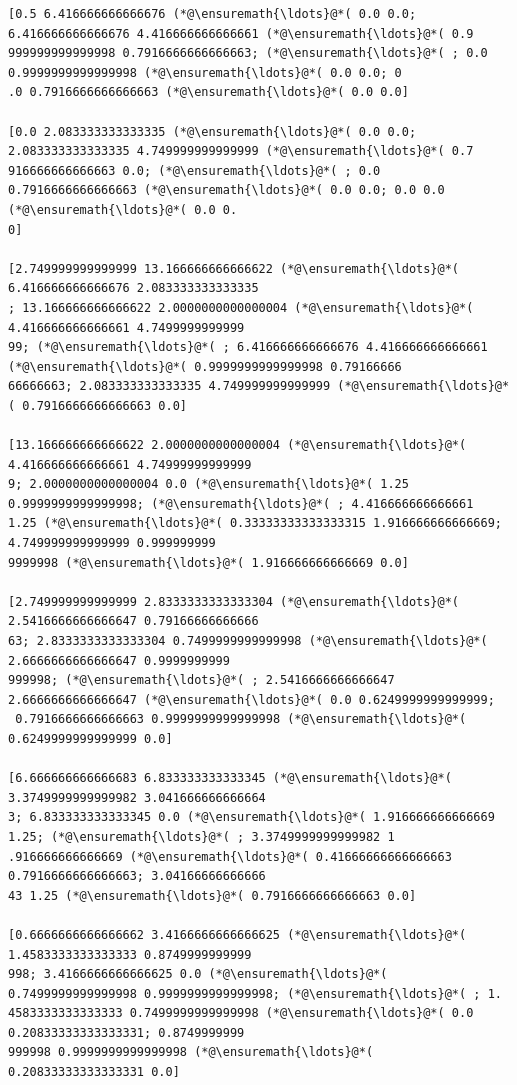 \documentclass[12pt,a4paper]{article}
\begin{document}
\begin{lstlisting}
[0.5 6.416666666666676 (*@\ensuremath{\ldots}@*( 0.0 0.0; 6.416666666666676 4.416666666666661 (*@\ensuremath{\ldots}@*( 0.9
999999999999998 0.7916666666666663; (*@\ensuremath{\ldots}@*( ; 0.0 0.9999999999999998 (*@\ensuremath{\ldots}@*( 0.0 0.0; 0
.0 0.7916666666666663 (*@\ensuremath{\ldots}@*( 0.0 0.0]

[0.0 2.083333333333335 (*@\ensuremath{\ldots}@*( 0.0 0.0; 2.083333333333335 4.749999999999999 (*@\ensuremath{\ldots}@*( 0.7
916666666666663 0.0; (*@\ensuremath{\ldots}@*( ; 0.0 0.7916666666666663 (*@\ensuremath{\ldots}@*( 0.0 0.0; 0.0 0.0 (*@\ensuremath{\ldots}@*( 0.0 0.
0]

[2.749999999999999 13.166666666666622 (*@\ensuremath{\ldots}@*( 6.416666666666676 2.083333333333335
; 13.166666666666622 2.0000000000000004 (*@\ensuremath{\ldots}@*( 4.416666666666661 4.7499999999999
99; (*@\ensuremath{\ldots}@*( ; 6.416666666666676 4.416666666666661 (*@\ensuremath{\ldots}@*( 0.9999999999999998 0.79166666
66666663; 2.083333333333335 4.749999999999999 (*@\ensuremath{\ldots}@*( 0.7916666666666663 0.0]

[13.166666666666622 2.0000000000000004 (*@\ensuremath{\ldots}@*( 4.416666666666661 4.74999999999999
9; 2.0000000000000004 0.0 (*@\ensuremath{\ldots}@*( 1.25 0.9999999999999998; (*@\ensuremath{\ldots}@*( ; 4.416666666666661 
1.25 (*@\ensuremath{\ldots}@*( 0.33333333333333315 1.916666666666669; 4.749999999999999 0.999999999
9999998 (*@\ensuremath{\ldots}@*( 1.916666666666669 0.0]

[2.749999999999999 2.8333333333333304 (*@\ensuremath{\ldots}@*( 2.5416666666666647 0.79166666666666
63; 2.8333333333333304 0.7499999999999998 (*@\ensuremath{\ldots}@*( 2.6666666666666647 0.9999999999
999998; (*@\ensuremath{\ldots}@*( ; 2.5416666666666647 2.6666666666666647 (*@\ensuremath{\ldots}@*( 0.0 0.6249999999999999;
 0.7916666666666663 0.9999999999999998 (*@\ensuremath{\ldots}@*( 0.6249999999999999 0.0]

[6.666666666666683 6.833333333333345 (*@\ensuremath{\ldots}@*( 3.3749999999999982 3.041666666666664
3; 6.833333333333345 0.0 (*@\ensuremath{\ldots}@*( 1.916666666666669 1.25; (*@\ensuremath{\ldots}@*( ; 3.3749999999999982 1
.916666666666669 (*@\ensuremath{\ldots}@*( 0.41666666666666663 0.7916666666666663; 3.04166666666666
43 1.25 (*@\ensuremath{\ldots}@*( 0.7916666666666663 0.0]

[0.6666666666666662 3.4166666666666625 (*@\ensuremath{\ldots}@*( 1.4583333333333333 0.8749999999999
998; 3.4166666666666625 0.0 (*@\ensuremath{\ldots}@*( 0.7499999999999998 0.9999999999999998; (*@\ensuremath{\ldots}@*( ; 1.
4583333333333333 0.7499999999999998 (*@\ensuremath{\ldots}@*( 0.0 0.20833333333333331; 0.8749999999
999998 0.9999999999999998 (*@\ensuremath{\ldots}@*( 0.20833333333333331 0.0]


\end{lstlisting}
\end{document}
